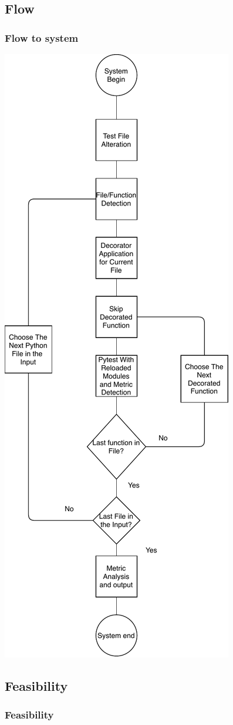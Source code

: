 \subsection{Flow}
\begin{frame}
  \frametitle{Flow to system}
    \begin{center}
      \includegraphics[scale = .25]{images/flow1}
    \end{center}
\end{frame}

\subsection{Feasibility}
\begin{frame}
  \frametitle{Feasibility}
  
\end{frame}

